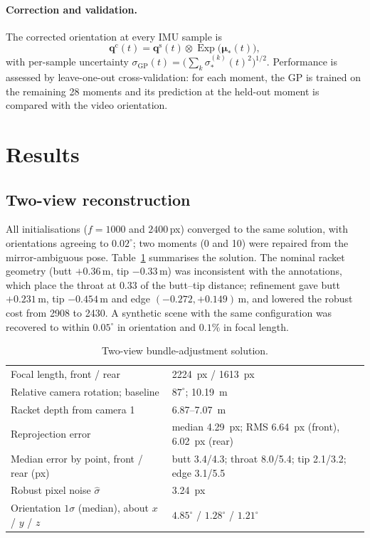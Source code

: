 \documentclass[11pt,a4paper]{article}
\newcommand{\q}{\bm{q}}
\newcommand{\ve}[1]{\bm{#1}}
\newcommand{\qmul}{\otimes}
\newcommand{\dg}{^{\circ}}
\newcommand{\Exp}{\operatorname{Exp}}
\begin{document}
\paragraph{Correction and validation.} The corrected orientation at every IMU sample is
\begin{equation}
\q^{\mathrm c}(t)=\q^{\mathrm s}(t)\qmul\Exp\bigl(\ve\mu_*(t)\bigr),
\end{equation}
with per-sample uncertainty $\sigma_{\mathrm{GP}}(t)=\bigl(\sum_k\sigma_*^{(k)}(t)^2\bigr)^{1/2}$.
Performance is assessed by leave-one-out cross-validation: for each moment, the GP is trained on the
remaining 28 moments and its prediction at the held-out moment is compared with the video
orientation.

\section{Results}
\subsection{Two-view reconstruction}
All initialisations ($f=1000$ and $2400$\,px) converged to the same solution, with orientations
agreeing to $0.02\dg$; two moments (0 and 10) were repaired from the mirror-ambiguous pose.
Table~\ref{tab:ba} summarises the solution. The nominal racket geometry (butt $+0.36$\,m,
tip $-0.33$\,m) was inconsistent with the annotations, which place the throat at $0.33$ of the
butt--tip distance; refinement gave butt $+0.231$\,m, tip $-0.454$\,m and edge
$(-0.272,+0.149)$\,m, and lowered the robust cost from 2908 to 2430. A synthetic scene with the same
configuration was recovered to within $0.05\dg$ in orientation and $0.1\%$ in focal length.

\begin{table}[H]\centering\small
\caption{Two-view bundle-adjustment solution.}\label{tab:ba}
\begin{tabular}{@{}ll@{}}\toprule
Focal length, front / rear & \SI{2224}{px} / \SI{1613}{px} \\
Relative camera rotation; baseline & $87\dg$; \SI{10.19}{m} \\
Racket depth from camera 1 & 6.87--\SI{7.07}{m} \\
Reprojection error & median \SI{4.29}{px}; RMS \SI{6.64}{px} (front), \SI{6.02}{px} (rear) \\
Median error by point, front / rear (px) & butt 3.4/4.3; throat 8.0/5.4; tip 2.1/3.2; edge 3.1/5.5 \\
Robust pixel noise $\hat\sigma$ & \SI{3.24}{px} \\
Orientation $1\sigma$ (median), about $x$ / $y$ / $z$ & $4.85\dg$ / $1.28\dg$ / $1.21\dg$ \\\bottomrule
\end{tabular}
\end{table}
\end{document}

